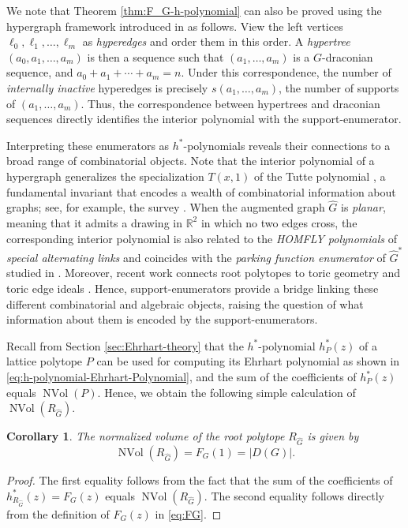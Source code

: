 \documentclass[11pt,a4paper]{article}
\newcommand{\NVol}{\operatorname{NVol}}
\newcommand{\1}{\mathbf{1}}
\theoremstyle{plain}
\newtheorem{corollary}[theorem]{Corollary}
\theoremstyle{definition}
\begin{document}
We note that Theorem \ref{thm:F_G-h-polynomial} can also be proved using the hypergraph framework introduced  in \cite{KalmanPostnikov2017} as follows. View the left vertices $\ell_0,\ell_1,\dots,\ell_m$ as \emph{hyperedges} and order them in this order. A \emph{hypertree} $(a_0,a_1,\dots, a_m)$ is then a sequence such that $(a_1,\dots, a_m)$ is a $G$-draconian sequence, and $a_0 + a_1 + \cdots + a_m = n.$ Under this correspondence, the number of \emph{internally inactive} hyperedges is precisely $s(a_1,\dots, a_m)$, the number of supports of $(a_1,\dots, a_m).$ Thus, the correspondence between hypertrees and draconian sequences directly identifies the interior polynomial with the support-enumerator.

Interpreting these enumerators as $h^*$-polynomials reveals their connections to a broad range of combinatorial objects. Note that the interior polynomial of a hypergraph generalizes the specialization $T(x,1)$ of the Tutte polynomial \cite{Tutte1954}, a fundamental invariant that encodes a wealth of combinatorial information about graphs; see, for example, the survey \cite{Ellis-nonaghanMerino2011}. When the augmented graph $\widehat G$ is \textit{planar}, meaning that it admits a drawing in $\mathbb{R}^2$ in which no two edges cross, the corresponding interior polynomial is also related to the \textit{HOMFLY polynomials} of \textit{special alternating links} \cite{Kalman2013RootPP} and coincides with the \textit{parking function enumerator} of $\widehat G^*$ \cite[Corollary 5.9]{KalmanPostnikov2017} studied in \cite{PostnikovBoris2004}. Moreover, recent work connects root polytopes to toric geometry \cite{Rietsch_Williams_2025} and toric edge ideals \cite{AlmousaEtal2025}. Hence, support-enumerators provide a bridge linking these different combinatorial and algebraic objects, raising the question of what information about them is encoded by the support-enumerators.


Recall from Section \ref{sec:Ehrhart-theory} that the $h^*$-polynomial $h^*_P(z)$ of a lattice polytope $P$ can be used for computing its Ehrhart polynomial as shown in \eqref{eq:h-polynomial-Ehrhart-Polynomial}, and the sum of the coefficients of $h^*_P(z)$ equals $\NVol(P)$. Hence, we obtain the following simple calculation of $\NVol(R_{\widehat G}).$

\begin{corollary}\label{cor:normalized-volume-root-polytope}
    The normalized volume of the root polytope $R_{\widehat G}$ is given by 
    $$\NVol(R_{\widehat G}) = F_G(1) = |D(G)|.$$
\end{corollary}
\begin{proof}
    The first equality follows from the fact that the sum of the coefficients of $h^*_{R_{\widehat G}}(z) = F_G(z)$ equals $\NVol(R_{\widehat G})$. The second equality follows directly from the definition of $F_G(z)$ in \eqref{eq:FG}.
\end{proof}
\end{document}
